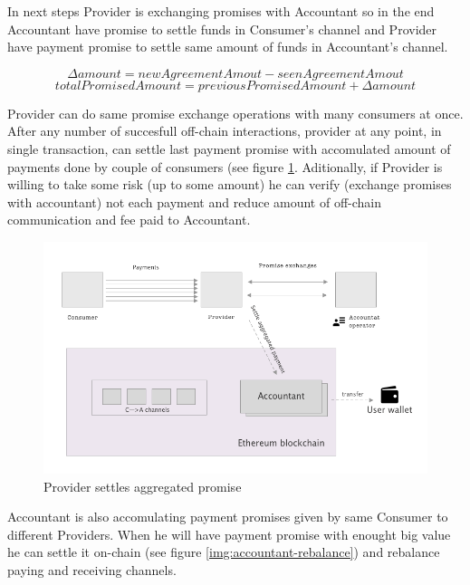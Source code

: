 \documentclass[a4paper,12pt]{article}
\begin{document}
In next steps Provider is exchanging promises with Accountant so in the end 
Accountant have promise to settle funds in Consumer's channel and Provider 
have payment promise to settle same amount of funds in Accountant's channel.

\[ \Delta amount = newAgreementAmout - seenAgreementAmout \]
\[ totalPromisedAmount = previousPromisedAmount + \Delta amount \]

Provider can do same promise exchange operations with many consumers at once. 
After any number of succesfull off-chain interactions, provider at any point, 
in single transaction, can settle last payment promise with accomulated amount 
of payments done by couple of consumers (see figure \ref{img:payment}. 
Aditionally, if Provider is willing to take some risk (up to some amount) he 
can verify (exchange promises with accountant) not each payment and reduce 
amount of off-chain communication and fee paid to Accountant.

\begin{figure}[H]
    \centering
    \includegraphics[scale=0.4]{../img/payment}
    \caption{Provider settles aggregated promise}
    \label{img:payment}
\end{figure}

Accountant is also accomulating payment promises given by same Consumer to 
different Providers. When he will have payment promise with enought big value 
he can settle it on-chain (see figure \ref{img:accountant-rebalance}) and 
rebalance paying and receiving channels.
\end{document}
